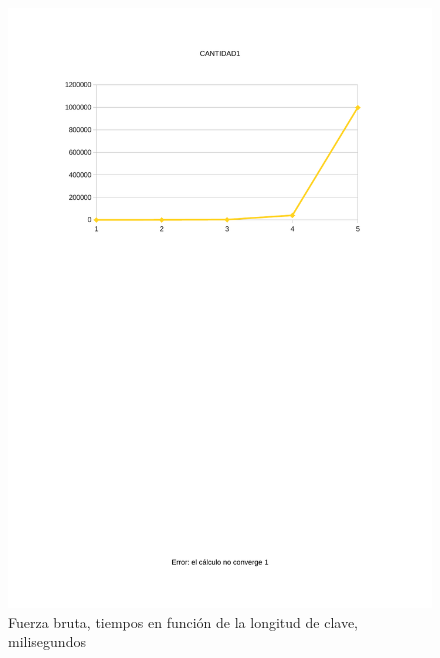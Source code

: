 \documentclass[12pt]{report}
\begin{document}
\begin{figure}
\includegraphics[width=1\textwidth]{img/brute.pdf}
\caption{Fuerza bruta, tiempos en función de la longitud de clave, milisegundos}
\label{fig:brute}
\end{figure}
\end{document}

